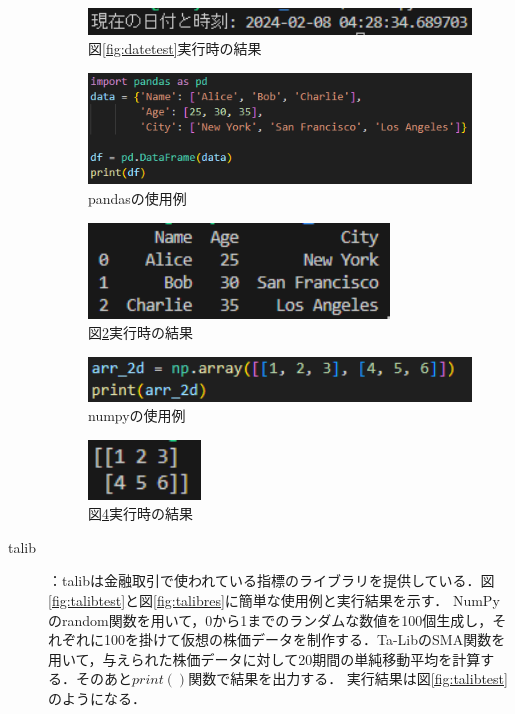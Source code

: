\begin{description}
   \begin{figure}[H]
    \centering
    \includegraphics[width=110mm]{fig/datetime_res.png}
    \caption{図\ref{fig:datetest}実行時の結果}
    \label{fig:dateres}
   \end{figure}
  
  \begin{figure}[H]
    \centering
    \includegraphics[width=110mm]{fig/pandas_test.png}
    \caption{pandasの使用例}
    \label{fig:pdtest}
   \end{figure}
  
   \begin{figure}[H]
    \centering
    \includegraphics[width=80mm]{fig/pandas_res.png}
    \caption{図\ref{fig:pdtest}実行時の結果}
    \label{fig:pdres}
   \end{figure}

   \begin{figure}[H]
    \centering
    \includegraphics[width=110mm]{fig/np_test.png}
    \caption{numpyの使用例}
    \label{fig:nptest}
   \end{figure}

   \begin{figure}[H]
    \centering
    \includegraphics[width=30mm]{fig/np_res.png}
    \caption{図\ref{fig:nptest}実行時の結果}
    \label{fig:npres}
   \end{figure}
  \item [talib]：talibは金融取引で使われている指標のライブラリを提供している\cite{talib}．図\ref{fig:talibtest}と図\ref{fig:talibres}に簡単な使用例と実行結果を示す．
NumPyのrandom関数を用いて，0から1までのランダムな数値を100個生成し，それぞれに100を掛けて仮想の株価データを制作する．Ta-LibのSMA関数を用いて，与えられた株価データに対して20期間の単純移動平均を計算する．そのあと$print()$関数で結果を出力する．
実行結果は図\ref{fig:talibtest}のようになる．



\end{description}
